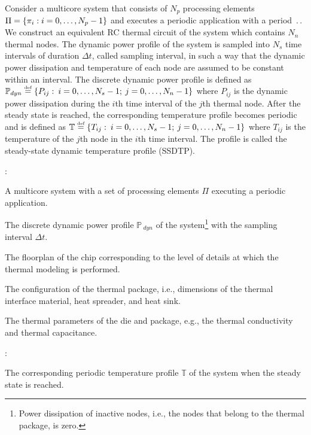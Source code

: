 Consider a multicore system that consists of $N_p$ processing elements $\Pi = \{ \pi_i: i = 0, \dots, N_p - 1 \}$ and executes a periodic application with a period $\period$. We construct an equivalent RC thermal circuit of the system which contains $N_n$ thermal nodes. The dynamic power profile of the system is sampled into $N_s$ time intervals of duration $\Delta t$, called sampling interval, in such a way that the dynamic power dissipation and temperature of each node are assumed to be constant within an interval. The discrete dynamic power profile is defined as $\mathbb{P}_{dyn} \eqdef \{ P_{ij}: \: i = \range{0}{N_s - 1}; \: j = \range{0}{N_n - 1} \}$ where $P_{ij}$ is the dynamic power dissipation during the $i$th time interval of the $j$th thermal node. After the steady state is reached, the corresponding temperature profile becomes periodic and is defined as $\mathbb{T} \eqdef \{ T_{ij}: \: i = \range{0 }{N_s - 1}; \: j = \range{0}{N_n - 1} \}$ where $T_{ij}$ is the temperature of the $j$th node in the $i$th time interval. The profile is called the steady-state dynamic temperature profile (SSDTP).

:
\begin{ilist}
  \item A multicore system with a set of processing elements $\Pi$ executing a periodic application.
  \item The discrete dynamic power profile $\mathbb{P}_{\:dyn}$ of the system\footnote{Power dissipation of inactive nodes, i.e., the nodes that belong to the thermal package, is zero.} with the sampling interval $\Delta t$.
  \item The floorplan of the chip corresponding to the level of details at which the thermal modeling is performed.
  \item The configuration of the thermal package, i.e., dimensions of the thermal interface material, heat spreader, and heat sink.
  \item The thermal parameters of the die and package, e.g., the thermal conductivity and thermal capacitance.
\end{ilist}

:
\begin{ilist}
  \item The corresponding periodic temperature profile $\mathbb{T}$ of the system when the steady state is reached.
\end{ilist}
